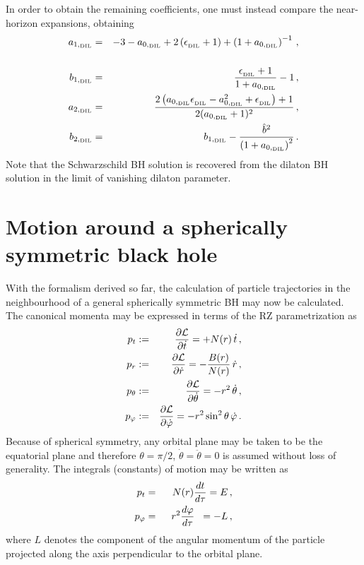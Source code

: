 \documentclass[a4paper,aps,twocolumn,showpacs,showkeys,nofootinbib,preprintnumbers,superscriptaddress,amsmath,amssymb,amsfonts]{revtex4-1}
\begin{document}
%
In order to obtain the remaining coefficients, one must instead compare
the near-horizon expansions, obtaining
%
\begin{eqnarray}
a_{1,{_{\rm DIL}}} &=& - 3 - a_{0,{_{\rm DIL}}} + 2\left(\epsilon_{_{\rm DIL}}+1 \right) 
+ \left(1+a_{0,{_{\rm DIL}}}\right)^{-1} \,,
\nonumber \\ \\
b_{1,{_{\rm DIL}}} &=& \frac{\epsilon_{_{\rm DIL}}+1}{1+a_{0,{_{\rm DIL}}}}-1 \,, \\
a_{2,{_{\rm DIL}}} &=& \frac{ 2\left( a_{0,{_{\rm DIL}}} \epsilon_{_{\rm DIL}} - 
                                       a_{0,{_{\rm DIL}}}^2 +\epsilon_{_{\rm DIL}}\right) +1}
                                       {2 (a_{0,{_{\rm DIL}}}+1)^2} \,, \\
b_{2,{_{\rm DIL}}} &=& b_{1,{_{\rm DIL}}}-\frac{\hat{b}^2}{\left(1+a_{0,{_{\rm DIL}}}\right)^2} \,.
\end{eqnarray}
%
Note that the Schwarzschild BH solution is recovered from the dilaton BH
solution in the limit of vanishing dilaton parameter.


\section{Motion around a spherically symmetric black hole}
\label{quattro}

With the formalism derived so far, the
calculation of particle trajectories in the neighbourhood of 
a general spherically symmetric BH may now be calculated.
The canonical momenta may be expressed in terms
of the RZ parametrization as
%
\begin{eqnarray}
p_t &:=& \frac{\partial{\cal L}}{\partial\dot{t}} = + N(r) \ \! \dot{t} \,, \\
p_r &:=& \frac{\partial{\cal L}}{\partial\dot{r}} = - \frac{B(r)}{N(r)} \ \! \dot{r} \,, \\
p_\theta &:=& \frac{\partial{\cal L}}{\partial\dot{\theta}} = - r^2 \ \! \dot{\theta} \,,\\
p_\varphi &:=& \frac{\partial{\cal L}}{\partial\dot{\varphi}} = - r^2\sin^2\theta \ \! \dot{\varphi} \,.
\end{eqnarray}
%
Because of spherical symmetry, any orbital plane may be taken to be the
equatorial plane and therefore
$\theta=\pi/2$, $\dot \theta=\ddot \theta=0$ is assumed without loss of
generality. The integrals (constants) of motion may be written as
%
\begin{eqnarray}
p_t &=& N(r)\dfrac{dt}{d \tau} = E \,, \label{ptE} \\
p_\varphi &=& \hspace*{2mm} r^2 \dfrac{d \varphi}{d\tau} \hspace*{2mm}= -L \,, \label{pphiL}  
\end{eqnarray}
where $L$ denotes the component of the angular momentum of the particle
projected along the axis perpendicular to the orbital plane.
\end{document}
